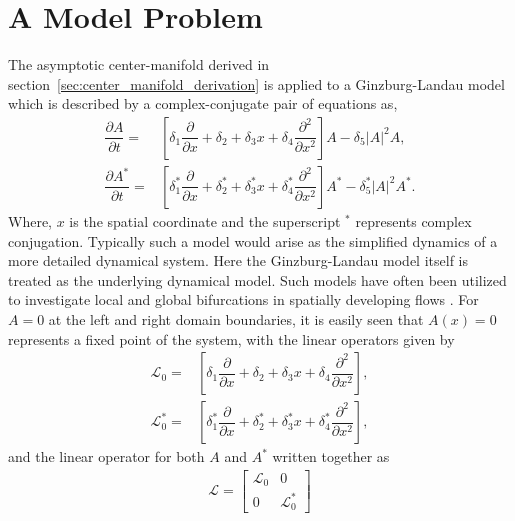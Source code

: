 \section{A Model Problem}
\label{sec:ginzburg_landau}

The asymptotic center-manifold derived in section~\ref{sec:center_manifold_derivation} is applied to a Ginzburg-Landau model which is described by a complex-conjugate pair of equations as,
\begin{subequations}
	\label{eqn:ginzburg_landau}
	\begin{align}
		\dfrac{\partial A}{\partial t} =& \left[\delta_{1}\dfrac{\partial}{\partial x} + \delta_{2} + \delta_{3}x + \delta_{4}\dfrac{\partial^{2}}{\partial x^{2}}\right]A - \delta_{5}|A|^{2}A, \\
		\dfrac{\partial A^{*}}{\partial t} =& \left[\delta^{*}_{1}\dfrac{\partial}{\partial x} + \delta^{*}_{2} + \delta^{*}_{3}x + \delta^{*}_{4}\dfrac{\partial^{2}}{\partial x^{2}}\right]A^{*} - \delta^{*}_{5}|A|^{2}A^{*}. 
	\end{align}
\end{subequations}
Where, $x$ is the spatial coordinate and the superscript $^{*}$ represents complex conjugation. Typically such a model would arise as the simplified dynamics of a more detailed dynamical system. Here the Ginzburg-Landau model itself is treated as the underlying dynamical model. Such models have often been utilized to investigate local and global bifurcations in spatially developing flows \citep{chomaz88,chomaz05}. For $A=0$ at the left and right domain boundaries, it is easily seen that $A(x)=0$ represents a fixed point of the system, with the linear operators given by
\begin{align}
	\mathcal{L}_{0}	=& \left[\delta_{1}\dfrac{\partial}{\partial x} + \delta_{2} + \delta_{3}x + \delta_{4}\dfrac{\partial^{2}}{\partial x^{2}}\right], \nonumber \\
	\mathcal{L}^{*}_{0} =&\left[\delta^{*}_{1}\dfrac{\partial}{\partial x} + \delta^{*}_{2} + \delta^{*}_{3}x + \delta^{*}_{4}\dfrac{\partial^{2}}{\partial x^{2}}\right], \nonumber
\end{align}
and the linear operator for both $A$ and $A^{*}$ written together as
\begin{eqnarray}
	\mathcal{L} = \begin{bmatrix}
		\mathcal{L}_{0}		& 0 \\
		0								  & \mathcal{L}^{*}_{0}
	\end{bmatrix}
\end{eqnarray}

